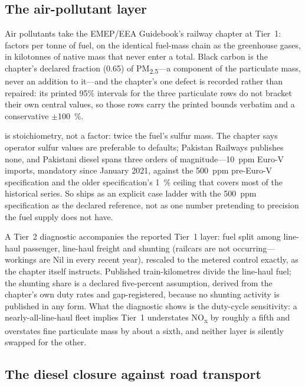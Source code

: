 \subsection{The air-pollutant layer}
\label{sec:air}

Air pollutants take the EMEP/EEA Guidebook's railway chapter \citep{emep2023rail} at
Tier~1: factors per tonne of fuel, on the identical fuel-mass chain as the greenhouse
gases, in kilotonnes of native mass that never enter a \COe{} total. Black carbon is the
chapter's declared fraction (\num{0.65}) of PM\textsubscript{2.5}---a component of the
particulate mass, never an addition to it---and the chapter's one defect is recorded
rather than repaired: its printed 95\% intervals for the three particulate rows do not
bracket their own central values, so those rows carry the printed bounds verbatim and a
conservative $\pm$\SI{100}{\percent}.

\SOtwo{} is stoichiometry, not a factor: twice the fuel's sulfur mass. The chapter says
operator sulfur values are preferable to defaults; Pakistan Railways publishes none, and
Pakistani diesel spans three orders of magnitude---\SI{10}{ppm} Euro-V imports, mandatory
since January 2021, against the \SI{500}{ppm} pre-Euro-V specification and the older
specification's \SI{1}{\percent} ceiling that covers most of the historical series. So
\SOtwo{} ships as an explicit case ladder with the \SI{500}{ppm} specification as the
declared reference, not as one number pretending to precision the fuel supply does not
have.

A Tier~2 diagnostic accompanies the reported Tier~1 layer: fuel split among line-haul
passenger, line-haul freight and shunting (railcars are not occurring---workings are Nil
in every recent year), rescaled to the metered control exactly, as the chapter itself
instructs. Published train-kilometres divide the line-haul fuel; the shunting share is a
declared five-percent assumption, derived from the chapter's own duty rates and
gap-registered, because no shunting activity is published in any form. What the diagnostic
shows is the duty-cycle sensitivity: a nearly-all-line-haul fleet implies Tier~1
understates NO\textsubscript{x} by roughly a fifth and overstates fine particulate mass by
about a sixth, and neither layer is silently swapped for the other.

\subsection{The diesel closure against road transport}
\label{sec:closure}

